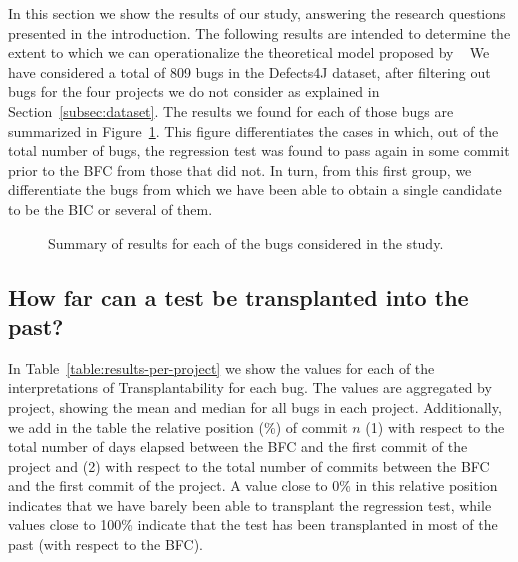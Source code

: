 In this section we show the results of our study, answering the research questions presented in the introduction. 
The following results are intended to determine the extent to which we can operationalize the theoretical model proposed by \gema~
We have considered a total of 809 bugs in the Defects4J dataset, after filtering out bugs for the four projects we do not consider as explained in Section~\ref{subsec:dataset}. The results we found for each of those bugs are summarized in Figure~\ref{fig:experiment-overview}. 
This figure differentiates the cases in which, out of the total number of bugs, the regression test was found to pass again in some commit prior to the BFC from those that did not. In turn, from this first group, we differentiate the bugs from which we have been able to obtain a single candidate to be the BIC or several of them.

\begin{figure}[h!]
    \centering    
    
    \caption{Summary of results for each of the bugs considered in the study.}
    \label{fig:experiment-overview}
\end{figure}


\subsection{How far can a test be transplanted into the past?}
\label{results:rq1a}

In Table~\ref{table:results-per-project} we show the values for each of the interpretations of Transplantability for each bug. 
The values are aggregated by project, showing the mean and median for all bugs in each project. 
Additionally, we add in the table the relative position (\%) of commit $n$ (1) with respect to the total number of days elapsed between the BFC and the first commit of the project and (2) with respect to the total number of commits between the BFC and the first commit of the project. 
A value close to 0\% in this relative position indicates that we have barely been able to transplant the regression test, while values close to 100\% indicate that the test has been transplanted in most of the past (with respect to the BFC).

